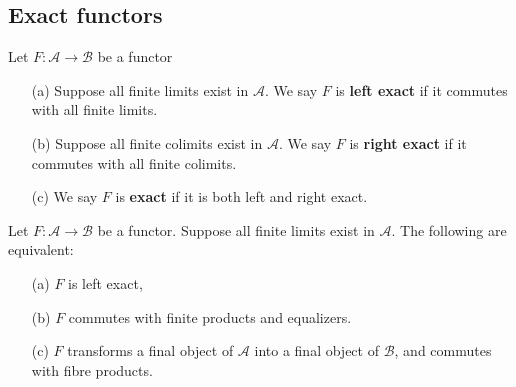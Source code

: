 \subsection{Exact functors}
\begin{definition}
Let $F:\mathcal{A}\to\mathcal{B}$ be a functor
\begin{enumerate}
\item[(a)] Suppose all finite limits exist in $\mathcal{A}$. We say $F$ is \textbf{left exact} if it commutes with all finite limits.
\item[(b)] Suppose all finite colimits exist in $\mathcal{A}$. We say $F$ is \textbf{right exact} if it commutes with all finite colimits.
\item[(c)] We say $F$ is \textbf{exact} if it is both left and right exact.
\end{enumerate}
\end{definition}
\begin{proposition}
Let $F:\mathcal{A}\to\mathcal{B}$ be a functor. Suppose all finite limits exist in $\mathcal{A}$. The following are equivalent:
\begin{enumerate}
\item[(a)] $F$ is left exact,
\item[(b)] $F$ commutes with finite products and equalizers.
\item[(c)] $F$ transforms a final object of $\mathcal{A}$ into a final object of $\mathcal{B}$, and commutes with fibre products.
\end{enumerate}
\end{proposition}
